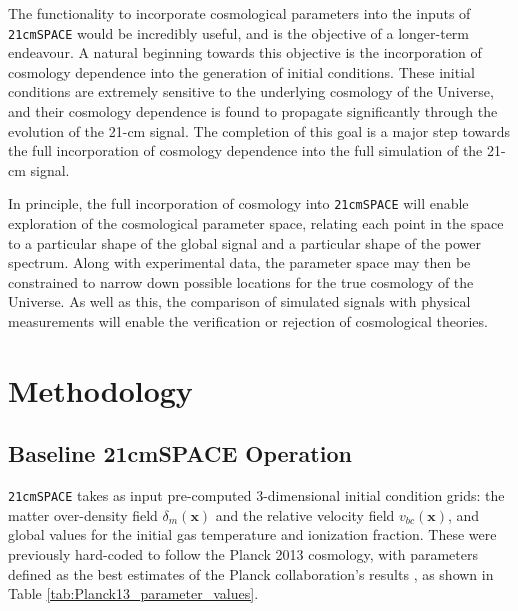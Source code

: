 \documentclass[floats,floatfix,showpacs,amssymb,prd,superscriptaddress,nofootinbib]{revtex4-2} %
\newcommand{\code}{\texttt}
\begin{document}
The functionality to incorporate cosmological parameters into the inputs of \code{21cmSPACE} would be incredibly useful, and is the objective of a longer-term endeavour. A natural beginning towards this objective is the incorporation of cosmology dependence into the generation of initial conditions. These initial conditions are extremely sensitive to the underlying cosmology of the Universe, and their cosmology dependence is found to propagate significantly through the evolution of the 21-cm signal. The completion of this goal is a major step towards the full incorporation of cosmology dependence into the full simulation of the 21-cm signal.


In principle, the full incorporation of cosmology into \code{21cmSPACE} will enable exploration of the cosmological parameter space, relating each point in the space to a particular shape of the global signal and a particular shape of the power spectrum. Along with experimental data, the parameter space may then be constrained to narrow down possible locations for the true cosmology of the Universe. As well as this, the comparison of simulated signals with physical measurements will enable the verification or rejection of cosmological theories.




\newpage
\section{Methodology}
\subsection{Baseline 21cmSPACE Operation}
\code{21cmSPACE} takes as input pre-computed 3-dimensional initial condition grids: the matter over-density field $\delta_m(\textbf{x})$ and the relative velocity field $v_{bc}(\textbf{x})$, and global values for the initial gas temperature and ionization fraction. These were previously hard-coded to follow the Planck 2013 cosmology, with parameters defined as the best estimates of the Planck collaboration's results \citep{Planck2013results} , as shown in Table \ref{tab:Planck13_parameter_values}. 

\end{document}
